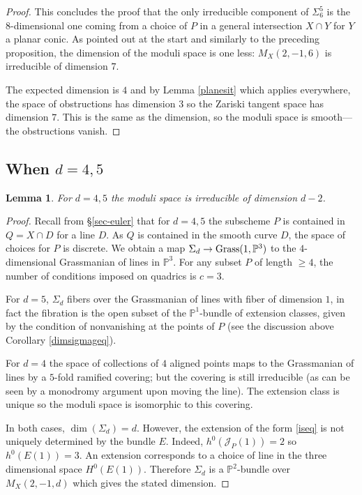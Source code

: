 \documentclass{amsart}
\theoremstyle{plain}
\newtheorem{lemma}[theorem]{Lemma}
\numberwithin{equation}{section}
\begin{document}
\begin{proof}
This concludes the proof that the only irreducible component of $\Sigma ^5_6$
is the $8$-dimensional one coming from a choice of $P$ in a general intersection
$X\cap Y$ for $Y$ a planar conic. As pointed out at the start and similarly to 
the preceding proposition, the dimension of the moduli space is one less: 
$M_X(2,-1,6)$ is irreducible of dimension $7$. 

The expected dimension is $4$ and by Lemma \ref{planesit} which applies everywhere,
the space of obstructions has dimension $3$ so the Zariski tangent space has dimension
$7$. This is the same as the dimension, so the moduli space is smooth---the obstructions
vanish. 
\end{proof}

\subsection{When $d=4,5$}

\begin{lemma}
\label{d45}
For $d=4,5$ the moduli space is irreducible of dimension $d-2$. 
\end{lemma}
\begin{proof}
Recall from \S \ref{sec-euler} that for $d=4,5$ the subscheme $P$ is 
contained in $Q=X\cap D$ for a line $D$. As $Q$ is contained in the smooth curve $D$,
the space of choices for $P$ is discrete. We obtain a map 
$\Sigma _d\rightarrow {{\rm Grass}} (1,{{\mathbb P}} ^3)$ to the $4$-dimensional Grassmanian of 
lines in ${{\mathbb P}} ^3$. For any subset $P$ of
length $\geq 4$, the number of conditions imposed on quadrics is $c=3$. 

For $d=5$, $\Sigma _d$ fibers over the 
Grassmanian of lines with fiber of dimension $1$, in fact the fibration is
the open subset of the ${{\mathbb P}} ^1$-bundle of extension classes, given by
the condition of nonvanishing at the points of $P$ (see the discussion above
Corollary \ref{dimsigmageq}). 

For $d=4$
the space of collections of $4$ aligned points maps 
to the Grassmanian of lines by a $5$-fold ramified covering;  but the covering is still irreducible
(as can be seen by a monodromy argument upon moving the line). The extension class is unique
so the moduli space is isomorphic to this covering. 

In both cases, $\dim (\Sigma _d)=d$. 
However, the extension of the form \eqref{iseq} is
not uniquely determined by the bundle $E$. Indeed, $h^0({{\mathcal J}} _P(1))=2$
so $h^0(E(1))=3$. An extension corresponds to a choice of line
in the three dimensional space $H^0(E(1))$. Therefore $\Sigma _d$ is a ${{\mathbb P}} ^2$-bundle over $M_X(2,-1,d)$
which gives the stated dimension. 
\end{proof}
\end{document}
